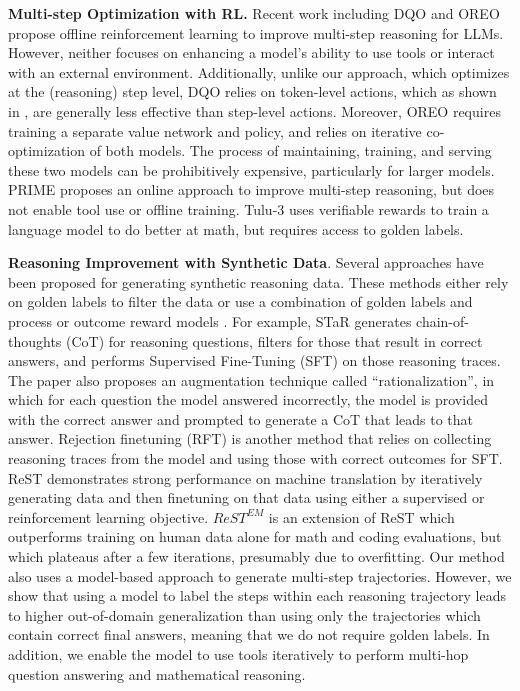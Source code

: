 \documentclass{article} %
\begin{document}
\noindent\textbf{Multi-step Optimization with RL.} Recent work including DQO \citep{liu2024enhancingmultistepreasoningabilities} and OREO \citep{wang2024offlinereinforcementlearningllm} propose offline reinforcement learning to improve multi-step reasoning for LLMs. However, neither focuses on enhancing a model's ability to use tools or interact with an external environment. Additionally, unlike our approach, which optimizes at the (reasoning) step level, DQO relies on token-level actions, which as shown in \citep{wang2024offlinereinforcementlearningllm}, are generally less effective than step-level actions. Moreover, OREO requires training a separate value network and policy, and relies on iterative co-optimization of both models. The process of maintaining, training, and serving these two models can be prohibitively expensive, particularly for larger models. PRIME \citep{cui2025processreinforcementimplicitrewards} proposes an online approach to improve multi-step reasoning, but does not enable tool use or offline training. Tulu-3 \citep{lambert2025tulu3pushingfrontiers} uses verifiable rewards to train a language model to do better at math, but requires access to golden labels.

\noindent\textbf{Reasoning Improvement with Synthetic Data}. Several approaches have been proposed for generating synthetic reasoning data. These methods either rely on golden labels to filter the data or use a combination of golden labels and process or outcome reward models \citep{zelikman2022starbootstrappingreasoningreasoning,singh2024humandatascalingselftraining}. For example, STaR \citep{zelikman2022starbootstrappingreasoningreasoning} generates chain-of-thoughts (CoT) for reasoning questions, filters for those that result in correct answers, and performs Supervised Fine-Tuning (SFT) on those reasoning traces. The paper also proposes an augmentation technique called ``rationalization'', in which for each question the model answered incorrectly, the model is provided with the correct answer and prompted to generate a CoT that leads to that answer. Rejection finetuning (RFT) \citep{yuan2023scalingrelationshiplearningmathematical} is another method that relies on collecting reasoning traces from the model and using those with correct outcomes for SFT. ReST \citep{gulcehre2023reinforcedselftrainingrestlanguage} demonstrates strong performance on machine translation by iteratively generating data and then finetuning on that data using either a supervised or reinforcement learning objective. $ReST^{EM}$ \citep{singh2024humandatascalingselftraining} is an extension of ReST which outperforms training on human data alone for math and coding evaluations, but which plateaus after a few iterations, presumably due to overfitting. Our method also uses a model-based approach to generate multi-step trajectories. However, we show that using a model to label the steps within each reasoning trajectory leads to higher out-of-domain generalization than using only the trajectories which contain correct final answers, meaning that we do not require golden labels. In addition, we enable the model to use tools iteratively to perform multi-hop question answering and mathematical reasoning.
\end{document}
